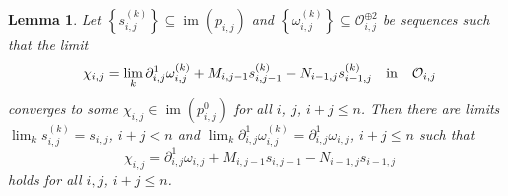\documentclass[12pt,reqno]{amsart}%
\theoremstyle{plain}
\newtheorem{lemma}{Lemma}
\numberwithin{theorem}{section} \numberwithin{equation}{section}
\numberwithin{lemma}{section}
\numberwithin{remark}{section}
\numberwithin{example}{section}
\numberwithin{proposition}{section}
\numberwithin{definition}{section}
\numberwithin{corollary}{section}
\begin{document}
\begin{lemma}
\label{lemOMN}Let $\left\{  s_{i,j}^{\left(  k\right)  }\right\}
\subseteq\operatorname{im}\left(  p_{i,j}\right)  $ and $\left\{  \omega
_{i,j}^{\left(  k\right)  }\right\}  \subseteq\mathcal{O}_{i,j}^{\oplus2}$ be
sequences such that the limit
\[
\chi_{i,j}=\lim_{k}\partial_{i,j}^{1}\omega_{i,j}^{\left(  k\right)
}+M_{i,j-1}s_{i,j-1}^{\left(  k\right)  }-N_{i-1,j}s_{i-1,j}^{\left(
k\right)  }\quad\text{in\quad}\mathcal{O}_{i,j}%
\]
converges to some $\chi_{i,j}\in\operatorname{im}\left(  p_{i,j}^{0}\right)  $
for all $i$, $j$, $i+j\leq n$. Then there are limits $\lim_{k}s_{i,j}^{\left(
k\right)  }=s_{i,j}$, $i+j<n$ and $\lim_{k}\partial_{i,j}^{1}\omega
_{i,j}^{\left(  k\right)  }=\partial_{i,j}^{1}\omega_{i,j}$, $i+j\leq n$ such
that
\[
\chi_{i,j}=\partial_{i,j}^{1}\omega_{i,j}+M_{i,j-1}s_{i,j-1}-N_{i-1,j}%
s_{i-1,j}%
\]
holds for all $i,j$, $i+j\leq n$.
\end{lemma}
\end{document}
